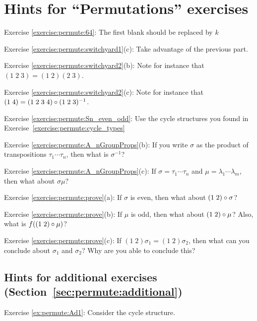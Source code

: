 \section{Hints for ``Permutations'' exercises}\label{sec:permute:hints} 

\noindent Exercise \ref{exercise:permute:64}: The first blank should be replaced by $k$

\noindent Exercise \ref{exercise:permute:switchyard1}(c): Take advantage of the previous part.

\noindent Exercise \ref{exercise:permute:switchyard2}(b): Note for instance that $(1 \;2 \; 3) = (1 \; 2) (2 \; 3)$.

\noindent Exercise \ref{exercise:permute:switchyard2}(c): Note for instance that $(1 \;4 ) = (1 \; 2 \; 3 \; 4) \circ (1 \; 2 \; 3 )^{-1}$.

\noindent Exercise \ref{exercise:permute:Sn_even_odd}: Use the cycle structures you found in Exercise~\ref{exercise:permute:cycle_types}


\noindent Exercise \ref{exercise:permute:A_nGroupProps}(b): If you write $\sigma$ as the product of transpositions $\tau_1 \cdots \tau_{n}$, then what is $\sigma^{-1}$?

\noindent Exercise \ref{exercise:permute:A_nGroupProps}(c): If $\sigma = \tau_1 \cdots \tau_{n}$ and $\mu = \lambda_1 \cdots \lambda_{m}$, then what about $\sigma \mu$?

\noindent Exercise \ref{exercise:permute:prove}(a): If $\sigma$ is even, then what about $(1 \; 2) \circ \sigma$?

\noindent Exercise \ref{exercise:permute:prove}(b): If $\mu$ is odd, then what about $(1 \; 2) \circ \mu$? Also, what is $f( (1 \; 2) \circ \mu )$?

\noindent Exercise \ref{exercise:permute:prove}(c): If $(1 \; 2) \sigma_1 = (1 \; 2) \sigma_2$, then what can you conclude about $\sigma_1$ and $\sigma_2$? Why are you able to conclude this?
\bigskip

\subsection{Hints for additional exercises (Section~\ref{sec:permute:additional})}

\noindent Exercise \ref{ex:permute:Ad1}: Consider the cycle structure.

